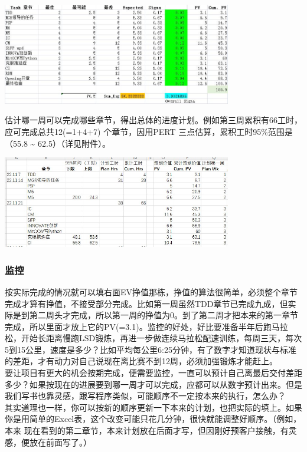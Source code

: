 \includegraphics[width=10cm]{psp11.jpg}

估计哪一周可以完成哪些章节，得出总体的进度计划。例如第三周累积有66工时，应可完成总共12(=1+4+7)
个章节，因用PERT 三点估算，累积工时95\%范围是（55.8 \textasciitilde{}
62.5）（详见附件）。


\includegraphics[width=10cm]{PSP3wksPlanScreenshot20221126085813.jpg}

\hypertarget{ux76d1ux63a7}{%
\subsubsection{监控}\label{ux76d1ux63a7}}

按实际完成的情况就可以填右面EV挣值那栋，挣值的算法很简单，必须整个章节完成才算有挣值，不接受部分完成。比如第一周虽然TDD章节已完成九成，但实际是到第二周头才完成，所以第一周的挣值为0。到了第二周才把本来的第一章节完成，所以里面才放上它的PV(=3.1)。监控的好处，好比要准备半年后跑马拉松，开始长距离慢跑LSD锻炼，再进一步做连续马拉松配速训练，每周三天，每次5到15公里，速度是多少？比如平均每公里6:25分钟，有了数字才知道现状与标准的差距，才有动力对自己说现在离比赛不到12周，必须加强锻炼才能赶上。\\
要让项目有更大的机会按期完成，便需要监控，一直可以预计自己离最后交付差距多少？如果按现在的进展要到哪一周才可以完成，应都可以从数字预计出来。但是我们写书也靠灵感，跟写程序类似，可能顺序不一定按本来的执行，怎么办？\\
其实道理也一样，你可以按新的顺序更新一下本来的计划，也把实际的填上。如果你是用简单的Excel表，这个改变可能只花几分钟，很快就能调整好顺序。（例如，本来
现在看到的第二章节，本来计划放在后面才写，但因刚好预客户接触，有灵感，便放在前面写了。）


